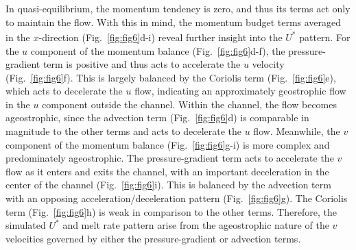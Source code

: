 \documentclass[draft]{agujournal2019}
\begin{document}
In quasi-equilibrium, the momentum tendency is zero, and thus its terms act only to maintain the flow. With this in mind, the momentum budget terms averaged in the $x$-direction (Fig.~\ref{fig:fig6}d-i) reveal further insight into the $\overline{U^*}$ pattern. For the $u$ component of the momentum balance (Fig.~\ref{fig:fig6}d-f), 
the pressure-gradient term is positive and thus acts to accelerate the $u$ velocity (Fig.~\ref{fig:fig6}f). This is largely balanced by the Coriolis term (Fig.~\ref{fig:fig6}e), which acts to decelerate the $u$ flow, indicating an approximately geostrophic flow in the $u$ component outside the channel. Within the channel, the flow becomes ageostrophic, since the advection term (Fig.~\ref{fig:fig6}d) is comparable in magnitude to the other terms and acts to decelerate the $u$ flow.
Meanwhile, the $v$ component of the momentum balance (Fig.~\ref{fig:fig6}g-i) is more complex and predominately ageostrophic. 
The pressure-gradient term acts to accelerate the $v$ flow as it enters and exits the channel, with an important deceleration in the center of the channel (Fig.~\ref{fig:fig6}i). This is balanced by the advection term with an opposing acceleration/deceleration pattern (Fig.~\ref{fig:fig6}g). The Coriolis term (Fig.~\ref{fig:fig6}h) is weak in comparison to the other terms. Therefore, the simulated $U^*$ and melt rate pattern arise from the ageostrophic nature of the $v$ velocities governed by either the pressure-gradient or advection terms. 
\end{document}

